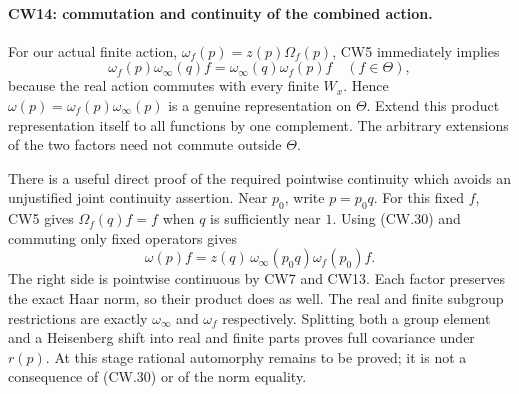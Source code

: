 \paragraph{CW14: commutation and continuity of the combined action.}
For our actual finite action,
$\omega_f(p)=z(p)\Omega_f(p)$, CW5 immediately implies
\[
            \omega_f(p)\omega_\infty(q)f
             =\omega_\infty(q)\omega_f(p)f\quad(f\in\Theta),
                                                               \tag{CW.30}
\]
because the real action commutes with every finite $W_x$.
Hence $\omega(p)=\omega_f(p)\omega_\infty(p)$ is a genuine
representation on $\Theta$.  Extend this product representation
itself to all functions by one complement.  The arbitrary
extensions of the two factors need not commute outside $\Theta$.

There is a useful direct proof of the required pointwise continuity
which avoids an unjustified joint continuity assertion.  Near
$p_0$, write $p=p_0q$.  For this fixed $f$, CW5 gives
$\Omega_f(q)f=f$ when $q$ is sufficiently near $1$.  Using (CW.30)
and commuting only fixed operators gives
\[
 \omega(p)f=z(q)\,\omega_\infty(p_0q)\omega_f(p_0)f.
                                                               \tag{CW.31}
\]
The right side is pointwise continuous by CW7 and CW13.
Each factor preserves the exact Haar norm, so their product does
as well.  The real and finite subgroup restrictions are exactly
$\omega_\infty$ and $\omega_f$ respectively.  Splitting both a
group element and a Heisenberg shift into real and finite parts
proves full covariance under $r(p)$.  At this stage rational
automorphy remains to be proved; it is not a consequence of
(CW.30) or of the norm equality.

